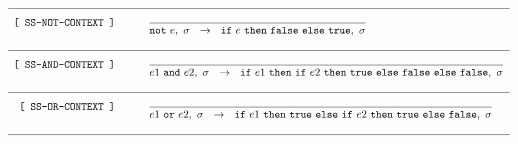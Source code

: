 \documentclass{article}
\begin{document}
  \pagebreak

\[
  \begin{array}{r@{\qquad}l}
   
    \hline

    \ssrule{
      SS-NOT-CONTEXT
    }{
      \enot{e},~\sigma
    }{
    }{
      \ife{e}{\false}{\true},~\sigma
    }



    \hline

    
    \ssrule{
      SS-AND-CONTEXT
    }{
      \eand{e1}{e2},~\sigma
    }{
    }{
      \ife{e1}{\ife{e2}{\true}{\false}}{\false},~\sigma
    }





    \hline

    \ssrule{
      SS-OR-CONTEXT
    }{
      \eor{e1}{e2},~\sigma
    }{
    }{
      \ife{e1}{\true}{\ife{e2}{\true}{\false}},~\sigma
    }





    \hline

  \end{array}
\]
\end{document}
